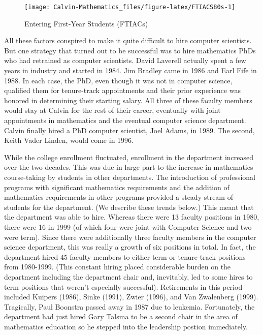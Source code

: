 \documentclass[
]{book}
\begin{document}
\begin{figure}

{\centering \texttt{[image: Calvin-Mathematics\_files/figure-latex/FTIACS80s-1]} 

}

\caption{Entering First-Year Students (FTIACs)}\label{fig:FTIACS80s}
\end{figure}

All these factors conspired to make it quite difficult to hire computer scientists. But one strategy that turned out to be successful was to hire mathematics PhDs who had retrained as computer scientists. David Laverell actually spent a few years in industry and started in 1984. Jim Bradley came in 1986 and Earl Fife in 1988. In each case, the PhD, even though it was not in computer science, qualified them for tenure-track appointments and their prior experience was honored in determining their starting salary. All three of these faculty members would stay at Calvin for the rest of their career, eventually with joint appointments in mathematics and the eventual computer science department.
Calvin finally hired a PhD computer scientist, Joel Adams, in 1989. The second, Keith Vader Linden, would come in 1996.

While the college enrollment fluctuated, enrollment in the department increased over the two decades. This was due in large part to the increase in mathematics course-taking by students in other departments. The introduction of professional programs with significant mathematics requirements and the addition of mathematics requirements in other programs provided a steady stream of students for the department. (We describe these trends below.) This meant that the department was able to hire. Whereas there were 13 faculty positions in 1980, there were 16 in 1999 (of which four were joint with Computer Science and two were term). Since there were additionally three faculty members in the computer science department, this was really a growth of six positions in total. In fact, the department hired 45 faculty members to either term or tenure-track positions from 1980-1999. (This constant hiring placed considerable burden on the department including the department chair and, inevitably, led to some hires to term positions that weren't especially successful). Retirements in this period included Kuipers (1986), Sinke (1991), Zwier (1996), and Van Zwalenberg (1999). Tragically, Paul Boonstra passed away in 1987 due to leukemia. Fortunately, the department had just hired Gary Talsma to be a second chair in the area of mathematics education so he stepped into the leadership postion immediately.
\end{document}
